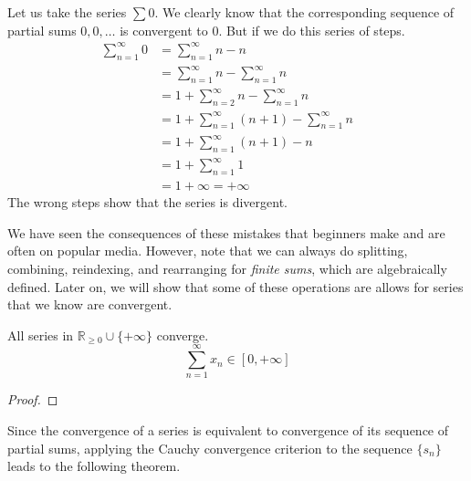   \begin{example}
    Let us take the series $\sum 0$. We clearly know that the corresponding sequence of partial sums $0, 0, \ldots$ is convergent to $0$. But if we do this series of steps. 
    \begin{align}
      \sum_{n=1}^\infty 0 & = \sum_{n=1}^\infty n - n && \tag{Can manipulate terms} \\
                          & = \sum_{n=1}^\infty n - \sum_{n=1}^\infty n && \tag{Cannot split series} \\ 
                          & = 1 + \sum_{n=2}^\infty n - \sum_{n=1}^\infty n && \tag{Can take 1st term out} \\ 
                          & = 1 + \sum_{n=1}^\infty (n+1) - \sum_{n=1}^\infty n && \tag{Cannot reindexing} \\
                          & = 1 + \sum_{n=1}^\infty (n+1) - n  && \tag{Cannot combine series} \\
                          & = 1 + \sum_{n=1}^\infty 1 && \tag{Can manipulate terms} \\
                          & = 1 + \infty = +\infty
    \end{align}
    The wrong steps show that the series is divergent. 
  \end{example} 

  We have seen the consequences of these mistakes that beginners make and are often on popular media. However, note that we can always do splitting, combining, reindexing, and rearranging for \textit{finite sums}, which are algebraically defined. Later on, we will show that some of these operations are allows for series that we know are convergent. 

  \begin{lemma}
    All series in $\mathbb{R}_{\geq 0} \cup \{+\infty\}$ converge. 
    \begin{equation}
      \sum_{n=1}^\infty x_n \in [0, +\infty]
    \end{equation}
  \end{lemma}
  \begin{proof}
    
  \end{proof}

  Since the convergence of a series is equivalent to convergence of its sequence of partial sums, applying the Cauchy convergence criterion to the sequence $\{s_n\}$ leads to the following theorem. 

